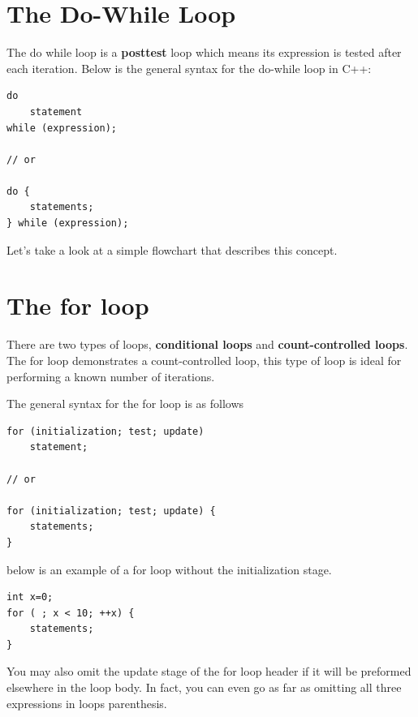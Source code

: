 \documentclass{report}
\begin{document}
    \pagebreak \bigbreak \noindent 
    \section{\LARGE The Do-While Loop}
    \bigbreak \noindent 
    \begin{concept}
 The do while loop is a \textbf{posttest} loop which means its expression is tested after each iteration. Below is the general syntax for the do-while loop in C++:
	\end{concept}
    \bigbreak \noindent 
    \sepline
    \begin{verbatim}
do 
    statement
while (expression);

// or 

do {
    statements;
} while (expression);
    \end{verbatim}
    \sepline
    \bigbreak \noindent 
    \begin{minipage}[]{0.47\textwidth}
        Let's take a look at a simple flowchart that describes this concept.
    
    \end{minipage}
    \begin{minipage}[]{0.47\textwidth}
    \end{minipage}

    \pagebreak \bigbreak \noindent 
    \section{\LARGE The for loop}
    \bigbreak \noindent 
    \begin{concept}
 There are two types of loops, \textbf{conditional loops} and \textbf{count-controlled loops}. The for loop demonstrates a count-controlled loop, this type of loop is ideal for performing a known number of iterations.
	\end{concept}
    \bigbreak \noindent 
    The general syntax for the for loop is as follows
    \bigbreak \noindent 
    \sepline
    \begin{verbatim}
for (initialization; test; update)  
    statement;

// or

for (initialization; test; update) { 
    statements;
}
    \end{verbatim}
    \sepline

    \bigbreak \noindent 
    \bigbreak \noindent 
    below is an example of a for loop without the initialization stage.
    \bigbreak \noindent 
    \sepline
    \begin{verbatim}
int x=0;
for ( ; x < 10; ++x) {
    statements;
}

    \end{verbatim}
    \sepline
    \bigbreak \noindent 
    You may also omit the update stage of the for loop header if it will be preformed elsewhere in the loop body. In fact, you can even go as far as omitting all three expressions in loops parenthesis.
\end{document}
